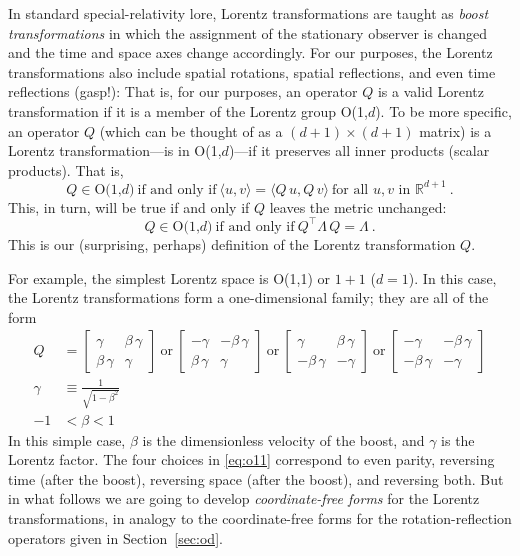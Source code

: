 \documentclass{article}
\newcommand{\inner}[2]{\langle{#1},{#2}\rangle}
\newcommand{\secref}[1]{Section~\ref{#1}}
\begin{document}
In standard special-relativity lore, Lorentz transformations are taught as \emph{boost transformations} in which the assignment of the stationary observer is changed and the time and space axes change accordingly.
For our purposes, the Lorentz transformations also include spatial rotations, spatial reflections, and even time reflections (gasp!):
That is, for our purposes, an operator $Q$ is a valid Lorentz transformation if it is a member of the Lorentz group O(1,$d$).
To be more specific, an operator $Q$ (which can be thought of as a $(d+1)\times(d+1)$ matrix) is a Lorentz transformation---is in O(1,$d$)---if it preserves all inner products (scalar products). 
That is,
\begin{equation}
    Q \in \mbox{O(1,$d$)} ~ \mbox{if and only if} ~ \inner{u}{v}=\inner{Q\,u}{Q\,v} ~ \mbox{for all $u,v$ in $\mathbb{R}^{d+1}$} ~ .
\end{equation}
This, in turn, will be true if and only if $Q$ leaves the metric unchanged:
\begin{equation}
    Q \in \mbox{O(1,$d$)} ~ \mbox{if and only if} ~ Q^\top\Lambda\,Q=\Lambda ~ .
\end{equation}
This is our (surprising, perhaps) definition of the Lorentz transformation $Q$.

For example, the simplest Lorentz space is O(1,1) or $1+1$ ($d=1$).
In this case, the Lorentz transformations form a one-dimensional family; they are all of the form
\begin{align}
    Q &= \begin{bmatrix}\gamma & \beta\,\gamma \\ \beta\,\gamma & \gamma\end{bmatrix} ~\mbox{or}~
    \begin{bmatrix}-\gamma & -\beta\,\gamma \\ \beta\,\gamma & \gamma\end{bmatrix} ~\mbox{or}~
    \begin{bmatrix}\gamma & \beta\,\gamma \\ -\beta\,\gamma & -\gamma\end{bmatrix}  ~\mbox{or}~
    \begin{bmatrix}-\gamma & -\beta\,\gamma \\ -\beta\,\gamma & -\gamma\end{bmatrix} \label{eq:o11}
    \\
    \gamma &\equiv \frac{1}{\sqrt{1 - \beta^2}}
    \\
    -1 &< \beta < 1
\end{align}
In this simple case, $\beta$ is the dimensionless velocity of the boost, and $\gamma$ is the Lorentz factor.
The four choices in \eqref{eq:o11} correspond to even parity, reversing time (after the boost), reversing space (after the boost), and reversing both.
But in what follows we are going to develop \emph{coordinate-free forms} for the Lorentz transformations, in analogy to the coordinate-free forms for the rotation-reflection operators given in \secref{sec:od}.
\end{document}

